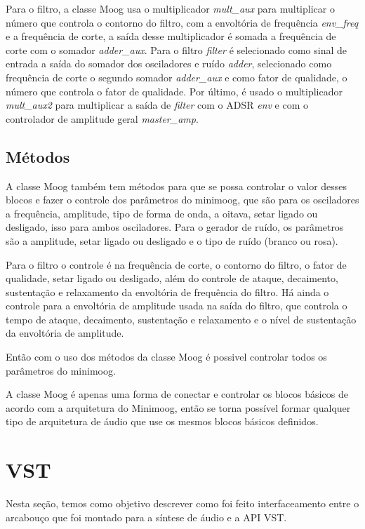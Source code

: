 \documentclass{article}
\begin{document}
Para o filtro, a classe Moog usa o multiplicador \emph{mult\_aux} para multiplicar o número que controla o contorno do filtro, com a envoltória de 
frequência \emph{env\_freq} e a frequência de corte, a saída desse multiplicador é somada a frequência de corte com o somador \emph{adder\_aux}.
Para o filtro \emph{filter} é selecionado como sinal de entrada a saída do somador dos osciladores e ruído \emph{adder}, selecionado como frequência 
de corte o segundo somador \emph{adder\_aux} e como fator de qualidade, o número que controla o fator de qualidade. Por último, é usado o multiplicador 
\emph{mult\_aux2} para multiplicar a saída de \emph{filter} com o ADSR \emph{env} e com o controlador de amplitude geral \emph{master\_amp}. 

  
\subsection{Métodos}
A classe Moog também tem métodos para que se possa controlar o valor desses blocos e fazer o controle dos parâmetros do minimoog, que são
 para os osciladores a frequência, amplitude, tipo de forma de onda, a oitava, setar ligado ou desligado, isso para ambos osciladores.
Para o gerador de ruído, os parâmetros são a amplitude, setar ligado ou desligado e o tipo de ruído (branco ou rosa).


Para o filtro o controle é na frequência de corte, o contorno do filtro, o fator de qualidade, setar ligado ou desligado, além do controle
 de ataque, decaimento, sustentação e relaxamento da envoltória de frequência do filtro.
Há ainda o controle para a envoltória de amplitude usada na saída do filtro, que controla o tempo de ataque, decaimento, sustentação e 
relaxamento e o nível de sustentação da envoltória de amplitude.


Então com o uso dos métodos da classe Moog é possivel controlar todos os parâmetros do minimoog.



A classe Moog é apenas uma forma de conectar e controlar os blocos básicos de acordo com a arquitetura do Minimoog, 
então se torna possível formar qualquer tipo de arquitetura 
 de áudio que use os mesmos blocos básicos definidos.





\section{VST}
Nesta seção, temos como objetivo 
descrever como foi feito interfaceamento entre o arcabouço que foi montado 
para a síntese de áudio e a API VST.
\end{document}
